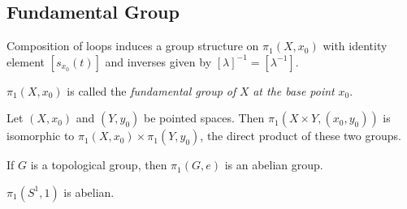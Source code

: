 \subsection{Fundamental Group}\label{fundamentalgroup}

\begin{theorem}
Composition of loops induces a group structure on $\pi_1(X, x_0)$ with identity element $[s_{x_0}(t)]$ and inverses given by $[\lambda]^{-1} = [\lambda^{-1}]$.
\end{theorem}

\noindent $\pi_1(X, x_0)$ is called the \emph{fundamental group of} $X$ \emph{at the base point} $x_0$.

\begin{theorem}
Let $(X,x_0)$ and $(Y,y_0)$ be pointed spaces. Then $\pi_1(X \times Y, (x_0,y_0))$ is isomorphic to $\pi_1(X,x_0) \times \pi_1(Y,y_0)$, the direct product of these two groups.
\end{theorem}

\begin{theorem}
If $G$ is a topological group, then $\pi_1(G, e)$ is an abelian group.
\end{theorem}

\begin{corollary}
$\pi_1(S^1, 1)$ is abelian.
\end{corollary}